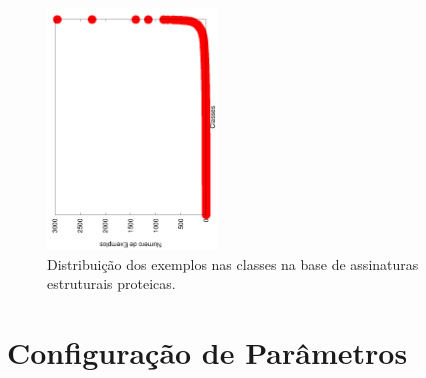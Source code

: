 


\begin{figure}[!h]
  \centering
  \includegraphics[angle=270, width=0.40\textwidth]{figures/perfil/astral.png}
 \caption{Distribuição dos exemplos nas classes na base de assinaturas estruturais proteicas.}
\label{fig::basesbio}
\end{figure}



\section{Configuração de Parâmetros}
\label{subsec::gpparam}


